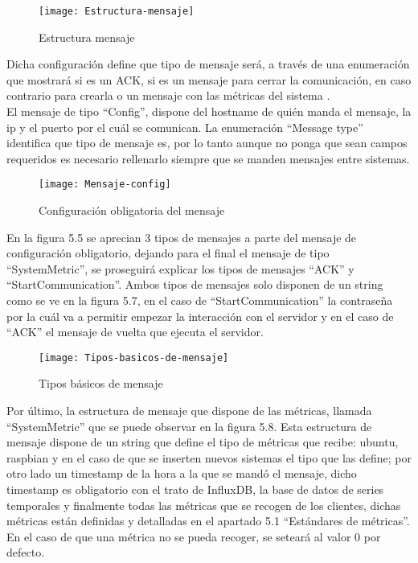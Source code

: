 \documentclass[ spanish, a4paper, 12pt, oneside]{report}
\begin{document}
\begin{figure}[!h]
   \centering
   \texttt{[image: Estructura-mensaje]}\\
      \caption{\label{fig: Estructura mensaje} Estructura mensaje}
\end{figure}

Dicha configuración define que tipo de mensaje será, a través de una enumeración que mostrará si es un ACK, si es un mensaje para cerrar la comunicación, en caso contrario para crearla o un mensaje con las métricas del sistema . \\

El mensaje de tipo ``Config'', dispone del hostname de quién manda el mensaje, la ip y el puerto por el cuál se comunican. La enumeración ``Message type'' identifica que tipo de mensaje es, por lo tanto aunque no ponga 
que sean campos requeridos es necesario rellenarlo siempre que se manden mensajes entre sistemas. \\

\begin{figure}[!h]
   \centering
   \texttt{[image: Mensaje-config]}\\
      \caption{\label{fig: Configuración obligatoria del mensaje} Configuración obligatoria del mensaje}
\end{figure}

En la figura 5.5 se aprecian 3 tipos de mensajes a parte del mensaje de configuración obligatorio, dejando para el final el mensaje de tipo ``SystemMetric'', se proseguirá explicar los tipos de mensajes ``ACK'' y ``StartCommunication''. 
Ambos tipos de mensajes solo disponen de un string como se ve en la figura 5.7, en el caso de ``StartCommunication'' la contraseña por la cuál va a permitir empezar la interacción con el servidor y en el caso de ``ACK'' el mensaje 
de vuelta que ejecuta el servidor. \\

\begin{figure}[!h]
   \centering
   \texttt{[image: Tipos-basicos-de-mensaje]}\\
      \caption{\label{fig: Tipos básicos de mensaje} Tipos básicos de mensaje}
\end{figure}

Por último, la estructura de mensaje que dispone de las métricas, llamada ``SystemMetric'' que se puede observar en la figura 5.8. Esta estructura de mensaje dispone de un string que define el tipo de métricas que recibe: ubuntu, raspbian y 
en el caso de que se inserten nuevos sistemas el tipo que las define; por otro lado un timestamp de la hora a la que se mandó el mensaje, dicho timestamp es obligatorio con el trato de InfluxDB, la base de datos de series temporales y finalmente todas las 
métricas que se recogen de los clientes, dichas métricas están definidas y detalladas en el apartado 5.1 ``Estándares de métricas''. En el caso de que una métrica no se pueda recoger, se seteará al valor 0 por defecto.\\
\end{document}
